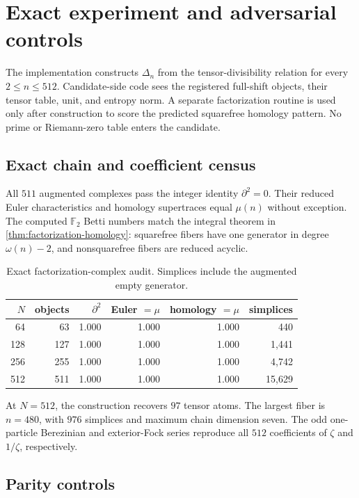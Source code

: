 \section{Exact experiment and adversarial controls}

The implementation constructs $\Delta_n$ from the tensor-divisibility
relation for every $2\le n\le512$. Candidate-side code sees the registered
full-shift objects, their tensor table, unit, and entropy norm. A separate
factorization routine is used only after construction to score the predicted
squarefree homology pattern. No prime or Riemann-zero table enters the
candidate.

\subsection{Exact chain and coefficient census}

All $511$ augmented complexes pass the integer identity $\partial^2=0$.
Their reduced Euler characteristics and homology supertraces equal $\mu(n)$
without exception. The computed $\mathbb F_2$ Betti numbers match the
integral theorem in \cref{thm:factorization-homology}: squarefree fibers have
one generator in degree $\omega(n)-2$, and nonsquarefree fibers are reduced
acyclic.

\begin{table}[t]
\centering
\small
\begin{tabular}{rrrrrr}
\toprule
$N$ & objects & $\partial^2$ & Euler $=\mu$ & homology $=\mu$ & simplices \\
\midrule
64  & 63  & 1.000 & 1.000 & 1.000 & 440 \\
128 & 127 & 1.000 & 1.000 & 1.000 & 1,441 \\
256 & 255 & 1.000 & 1.000 & 1.000 & 4,742 \\
512 & 511 & 1.000 & 1.000 & 1.000 & 15,629 \\
\bottomrule
\end{tabular}
\caption{Exact factorization-complex audit. Simplices include the augmented
empty generator.}
\label{tab:complex-audit}
\end{table}

At $N=512$, the construction recovers $97$ tensor atoms. The largest fiber
is $n=480$, with $976$ simplices and maximum chain dimension seven. The odd
one-particle Berezinian and exterior-Fock series reproduce all $512$
coefficients of $\zeta$ and $1/\zeta$, respectively.

\subsection{Parity controls}

